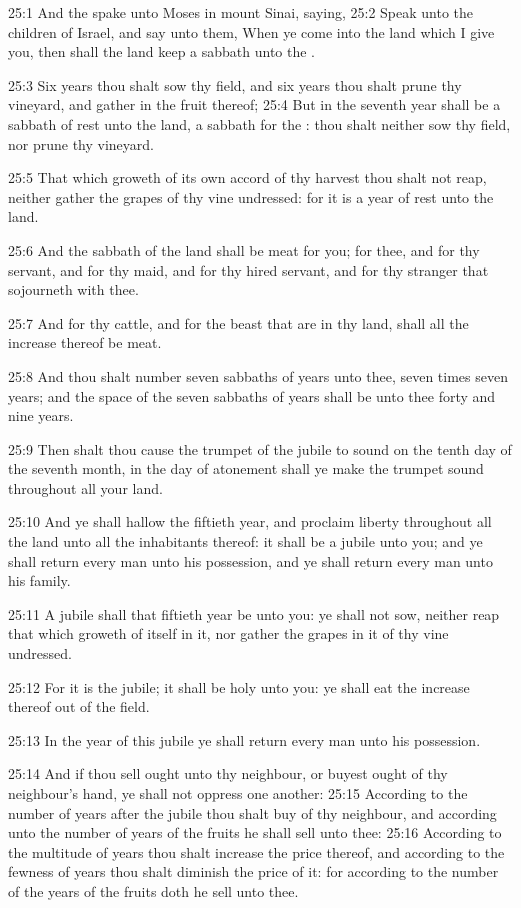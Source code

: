 25:1 And the \LORD spake unto Moses in mount Sinai, saying, 25:2 Speak
unto the children of Israel, and say unto them, When ye come into the
land which I give you, then shall the land keep a sabbath unto the
\LORD.

25:3 Six years thou shalt sow thy field, and six years thou shalt
prune thy vineyard, and gather in the fruit thereof; 25:4 But in the
seventh year shall be a sabbath of rest unto the land, a sabbath for
the \LORD: thou shalt neither sow thy field, nor prune thy vineyard.

25:5 That which groweth of its own accord of thy harvest thou shalt
not reap, neither gather the grapes of thy vine undressed: for it is a
year of rest unto the land.

25:6 And the sabbath of the land shall be meat for you; for thee, and
for thy servant, and for thy maid, and for thy hired servant, and for
thy stranger that sojourneth with thee.

25:7 And for thy cattle, and for the beast that are in thy land, shall
all the increase thereof be meat.

25:8 And thou shalt number seven sabbaths of years unto thee, seven
times seven years; and the space of the seven sabbaths of years shall
be unto thee forty and nine years.

25:9 Then shalt thou cause the trumpet of the jubile to sound on the
tenth day of the seventh month, in the day of atonement shall ye make
the trumpet sound throughout all your land.

25:10 And ye shall hallow the fiftieth year, and proclaim liberty
throughout all the land unto all the inhabitants thereof: it shall be
a jubile unto you; and ye shall return every man unto his possession,
and ye shall return every man unto his family.

25:11 A jubile shall that fiftieth year be unto you: ye shall not sow,
neither reap that which groweth of itself in it, nor gather the grapes
in it of thy vine undressed.

25:12 For it is the jubile; it shall be holy unto you: ye shall eat
the increase thereof out of the field.

25:13 In the year of this jubile ye shall return every man unto his
possession.

25:14 And if thou sell ought unto thy neighbour, or buyest ought of
thy neighbour's hand, ye shall not oppress one another: 25:15
According to the number of years after the jubile thou shalt buy of
thy neighbour, and according unto the number of years of the fruits he
shall sell unto thee: 25:16 According to the multitude of years thou
shalt increase the price thereof, and according to the fewness of
years thou shalt diminish the price of it: for according to the number
of the years of the fruits doth he sell unto thee.

